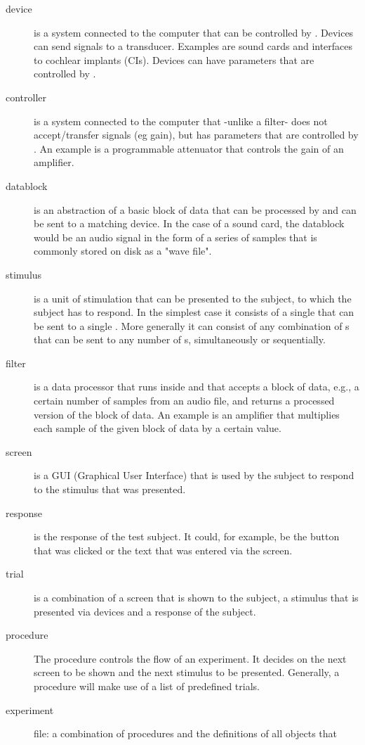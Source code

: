 {\begin{description}
\item[device] is a system connected to the computer that can be
controlled by \apex. Devices can send signals to a transducer.
Examples are sound cards and interfaces to cochlear implants
(CIs).  Devices can have parameters that are controlled by \apex.
\item[controller] is a system connected to the computer that
-unlike a filter- does not accept/transfer signals (eg gain), but
has parameters that are controlled by \apex. An example is a
programmable attenuator that controls the gain of an amplifier.
\item[datablock] is an abstraction of a basic block of data that
can be processed by \apex and can be sent to a matching device. In
the case of a sound card, the datablock would be an audio signal
in the form of a series of samples that is commonly stored on disk
as a "wave file". \item[stimulus] is a unit of stimulation that
can be presented to the subject, to which the subject has to
respond. In the simplest case it consists of a single
 that can be sent to a single .
More generally it can consist of any combination of
s that can be sent to any number of
s, simultaneously or sequentially. \item[filter]
is a data processor that runs inside \apex and that accepts a
block of data, e.g., a certain number of samples from an audio
file, and returns a processed version of the block of data. An
example is an amplifier that multiplies each sample of the given
block of data by a certain value. \item[screen] is a GUI
(Graphical User Interface) that is used by the subject to respond
to the stimulus that was presented. \item[response] is the
response of the test subject. It could, for example, be the button
that was clicked or the text that was entered via the screen.
\item[trial] is a combination of a screen that is shown to the
subject, a stimulus that is presented via devices and a response
of the subject. \item[procedure] The procedure controls the flow
of an experiment. It decides on the next screen to be shown and
the next stimulus to be presented. Generally, a procedure will
make use of a list of predefined trials. \item[experiment] file: a
combination of procedures and the definitions of all objects that

\end{description}}
